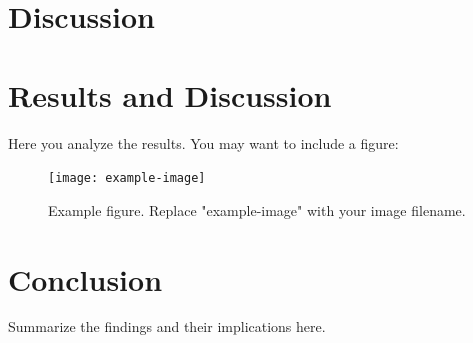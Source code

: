 \documentclass[a4paper,12pt]{article}
\begin{document}

	
	\section{Discussion}
	\label{dis}
	
	
	
	\section{Results and Discussion}
	Here you analyze the results. You may want to include a figure:
	
	\begin{figure}[h]
		\centering
		\texttt{[image: example-image]} %
		\caption{Example figure. Replace "example-image" with your image filename.}
		\label{fig:example}
	\end{figure}
	
	\section{Conclusion}
	Summarize the findings and their implications here.
	

	
	
\end{document}

